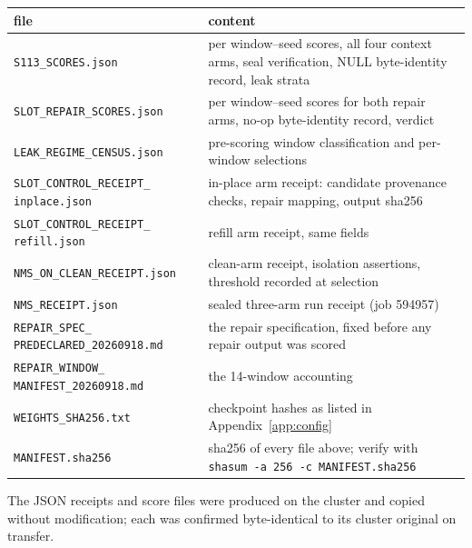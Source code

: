 \documentclass[11pt,a4paper]{article}
\newcommand{\code}[1]{\texttt{\small #1}}
\begin{document}
\begin{center}\small
\begin{tabular}{@{}L{6.6cm}L{7.9cm}@{}}
\toprule
file & content \\
\midrule
\code{S113\_SCORES.json} & per window--seed scores, all four context arms, seal verification, NULL byte-identity record, leak strata \\
\code{SLOT\_REPAIR\_SCORES.json} & per window--seed scores for both repair arms, no-op byte-identity record, verdict \\
\code{LEAK\_REGIME\_CENSUS.json} & pre-scoring window classification and per-window selections \\
\code{SLOT\_CONTROL\_RECEIPT\_} \code{inplace.json} & in-place arm receipt: candidate provenance checks, repair mapping, output sha256 \\
\code{SLOT\_CONTROL\_RECEIPT\_} \code{refill.json} & refill arm receipt, same fields \\
\code{NMS\_ON\_CLEAN\_RECEIPT.json} & clean-arm receipt, isolation assertions, threshold recorded at selection \\
\code{NMS\_RECEIPT.json} & sealed three-arm run receipt (job 594957) \\
\code{REPAIR\_SPEC\_} \code{PREDECLARED\_20260918.md} & the repair specification, fixed before any repair output was scored \\
\code{REPAIR\_WINDOW\_} \code{MANIFEST\_20260918.md} & the 14-window accounting \\
\code{WEIGHTS\_SHA256.txt} & checkpoint hashes as listed in Appendix~\ref{app:config} \\
\code{MANIFEST.sha256} & sha256 of every file above; verify with \code{shasum -a 256 -c MANIFEST.sha256} \\
\bottomrule
\end{tabular}
\end{center}

The JSON receipts and score files were produced on the cluster and copied without modification; each
was confirmed byte-identical to its cluster original on transfer.
\end{document}
